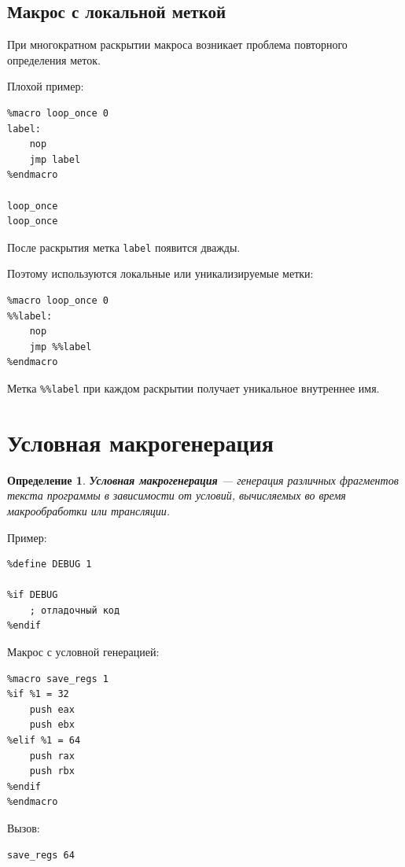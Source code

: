 \documentclass[12pt,a4paper]{article}
\newtheorem{definition}{Определение}
\begin{document}
\subsection{Макрос с локальной меткой}

При многократном раскрытии макроса возникает проблема повторного определения меток.

Плохой пример:

\begin{lstlisting}
%macro loop_once 0
label:
    nop
    jmp label
%endmacro

loop_once
loop_once
\end{lstlisting}

После раскрытия метка \texttt{label} появится дважды.

Поэтому используются локальные или уникализируемые метки:

\begin{lstlisting}
%macro loop_once 0
%%label:
    nop
    jmp %%label
%endmacro
\end{lstlisting}

Метка \texttt{\%\%label} при каждом раскрытии получает уникальное внутреннее имя.

\section{Условная макрогенерация}

\begin{definition}
\textbf{Условная макрогенерация} --- генерация различных фрагментов текста программы в зависимости от условий, вычисляемых во время макрообработки или трансляции.
\end{definition}

Пример:

\begin{lstlisting}
%define DEBUG 1

%if DEBUG
    ; отладочный код
%endif
\end{lstlisting}

Макрос с условной генерацией:

\begin{lstlisting}
%macro save_regs 1
%if %1 = 32
    push eax
    push ebx
%elif %1 = 64
    push rax
    push rbx
%endif
%endmacro
\end{lstlisting}

Вызов:

\begin{lstlisting}
save_regs 64
\end{lstlisting}
\end{document}
